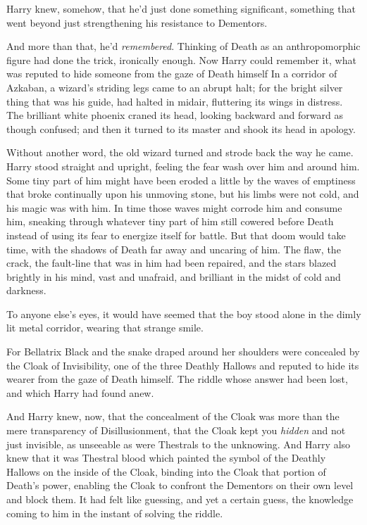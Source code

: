 Harry knew, somehow, that he'd just done something significant, something that
went beyond just strengthening his resistance to Dementors.

And more than that, he'd \emph{remembered}. Thinking of Death as an
anthropomorphic figure had done the trick, ironically enough. Now Harry could
remember it, what was reputed to hide someone from the gaze of Death
himself{\el}
\sbreak
In a corridor of Azkaban, a wizard's striding legs came to an abrupt halt; for
the bright silver thing that was his guide, had halted in midair, fluttering
its wings in distress. The brilliant white phoenix craned its head, looking
backward and forward as though confused; and then it turned to its master and
shook its head in apology.

Without another word, the old wizard turned and strode back the way he came.
\sbreak
Harry stood straight and upright, feeling the fear wash over him and around
him. Some tiny part of him might have been eroded a little by the waves of
emptiness that broke continually upon his unmoving stone, but his limbs were
not cold, and his magic was with him. In time those waves might corrode him and
consume him, sneaking through whatever tiny part of him still cowered before
Death instead of using its fear to energize itself for battle. But that doom
would take time, with the shadows of Death far away and uncaring of him. The
flaw, the crack, the fault-line that was in him had been repaired, and the
stars blazed brightly in his mind, vast and unafraid, and brilliant in the
midst of cold and darkness.

To anyone else's eyes, it would have seemed that the boy stood alone in the
dimly lit metal corridor, wearing that strange smile.

For Bellatrix Black and the snake draped around her shoulders were concealed by
the Cloak of Invisibility, one of the three Deathly Hallows and reputed to hide
its wearer from the gaze of Death himself. The riddle whose answer had been
lost, and which Harry had found anew.

And Harry knew, now, that the concealment of the Cloak was more than the mere
transparency of Disillusionment, that the Cloak kept you \emph{hidden} and not
just invisible, as unseeable as were Thestrals to the unknowing. And Harry also
knew that it was Thestral blood which painted the symbol of the Deathly Hallows
on the inside of the Cloak, binding into the Cloak that portion of Death's
power, enabling the Cloak to confront the Dementors on their own level and
block them. It had felt like guessing, and yet a certain guess, the knowledge
coming to him in the instant of solving the riddle.

